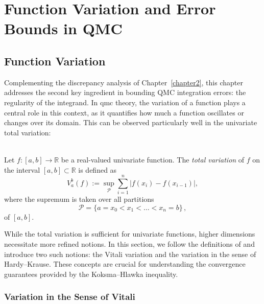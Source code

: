 \chapter{Function Variation and Error Bounds in QMC}
\label{chapter3}
\section{Function Variation}
\label{sec:variation}

Complementing the discrepancy analysis of Chapter~\ref{chapter2}, this chapter
addresses the second key ingredient in bounding QMC integration errors: the
regularity of the integrand. In \acf{qmc} theory, the variation of a function
plays a central role in this context, as it quantifies how much a function
oscillates or changes over its domain. This can be observed particularly well in
the univariate total variation:

\begin{definition} \ \\
Let $f:[a,b] \to \mathbb{R}$ be a real-valued univariate function.  
The \emph{total variation} of $f$ on the interval $[a,b]\subset \mathbb{R}$ is defined as
\begin{equation*}
    V_{a}^{b}(f) := \sup_{\mathcal{P}} \sum_{i=1}^{n} 
    \bigl| f(x_i) - f(x_{i-1}) \bigr|,
\end{equation*}
where the supremum is taken over all partitions
$$\mathcal{P}=\{a=x_0 < x_1 < \dots < x_n = b\}\,,$$
of $[a,b]$.
\end{definition}

While the total variation is sufficient for univariate functions, higher
dimensions necessitate more refined notions. In this section, we follow the
definitions of \cite{owen2005multidimensional} and introduce two such notions:
the Vitali variation and the variation in the sense of Hardy--Krause. These
concepts are crucial for understanding the convergence guarantees provided by
the Koksma--Hlawka inequality.

\subsection{Variation in the Sense of Vitali}
\label{sec:vitali-variation}

